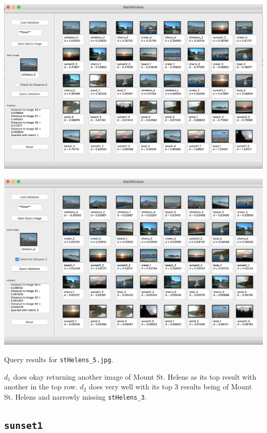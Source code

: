 \documentclass[letterpaper]{article}
\begin{document}
\begin{center}
  \includegraphics[width=\textwidth]{stHelens_5_distance1.png}
  
  \includegraphics[width=\textwidth]{stHelens_5_distance2.png}
  
  Query results for \texttt{stHelens\_5.jpg}.  
\end{center}

$d_1$ does okay returning another image of Mount St. Helens as its top result
with another in the top row. $d_2$ does very well with its top 3
results being of Mount St. Helens and narrowly missing \texttt{stHelens\_3}.

\subsection{\texttt{sunset1}}
\end{document}
